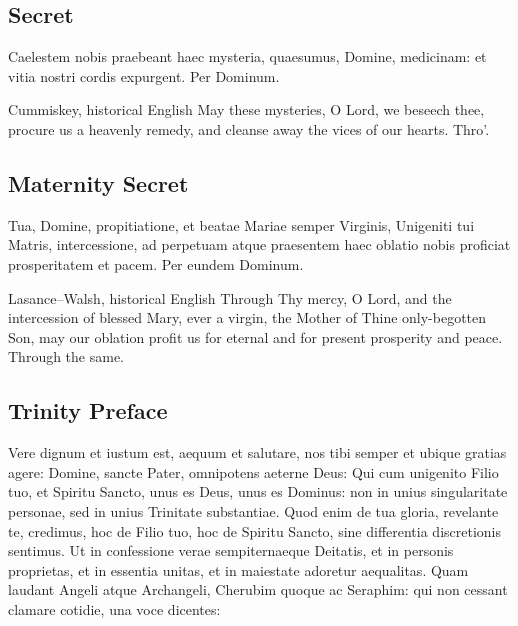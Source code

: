 
\subsection{Secret}\label{proper-secret}

\begin{latinproper}
Caelestem nobis praebeant haec mysteria, quaesumus, Domine, medicinam: et vitia nostri cordis expurgent. Per Dominum.
\end{latinproper}

\begin{englishwitness}{Cummiskey, historical English}
May these mysteries, O Lord, we beseech thee, procure us a heavenly remedy, and cleanse away the vices of our hearts. Thro'.
\end{englishwitness}

\subsection{Maternity Secret}\label{proper-maternity-secret}


\begin{latinproper}
Tua, Domine, propitiatione, et beatae Mariae semper Virginis, Unigeniti tui Matris, intercessione, ad perpetuam atque praesentem haec oblatio nobis proficiat prosperitatem et pacem. Per eundem Dominum.
\end{latinproper}

\begin{englishwitness}{Lasance--Walsh, historical English}
Through Thy mercy, O Lord, and the intercession of blessed Mary, ever a virgin, the Mother of Thine only-begotten Son, may our oblation profit us for eternal and for present prosperity and peace. Through the same.
\end{englishwitness}

\subsection{Trinity Preface}\label{proper-preface}

\begin{latinproper}
Vere dignum et iustum est, aequum et salutare, nos tibi semper et ubique gratias agere: Domine, sancte Pater, omnipotens aeterne Deus: Qui cum unigenito Filio tuo, et Spiritu Sancto, unus es Deus, unus es Dominus: non in unius singularitate personae, sed in unius Trinitate substantiae. Quod enim de tua gloria, revelante te, credimus, hoc de Filio tuo, hoc de Spiritu Sancto, sine differentia discretionis sentimus. Ut in confessione verae sempiternaeque Deitatis, et in personis proprietas, et in essentia unitas, et in maiestate adoretur aequalitas. Quam laudant Angeli atque Archangeli, Cherubim quoque ac Seraphim: qui non cessant clamare cotidie, una voce dicentes:
\end{latinproper}

